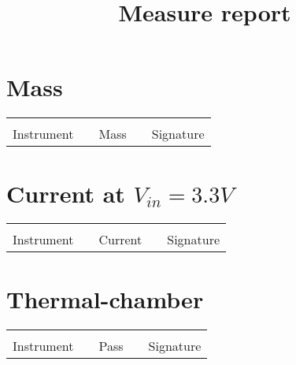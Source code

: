 \documentclass[12pt]{article}
\title{Measure report}
\begin{document}
\maketitle

\section{Mass}
\vspace{25mm}
\begin{tabular}{@{}C{1.5in}p{1in}C{1.5in}p{1in}C{1.5in}@{}}
	\hrulefill & \hfill & \hrulefill & \hfill & \hrulefill\\
	Instrument & \hfill & Mass & \hfill & Signature \\
\end{tabular}

\section{Current at $V_{in}=3.3V$}
\vspace{25mm}
\begin{tabular}{@{}C{1.5in}p{1in}C{1.5in}p{1in}C{1.5in}@{}}
	\hrulefill & \hfill & \hrulefill & \hfill & \hrulefill\\
	Instrument & \hfill & Current & \hfill & Signature \\
\end{tabular}

\section{Thermal-chamber}
\vspace{25mm}
\begin{tabular}{@{}C{1.5in}p{1in}C{1.5in}p{1in}C{1.5in}@{}}
	\hrulefill & \hfill & \hrulefill & \hfill & \hrulefill\\
	Instrument & \hfill & Pass & \hfill & Signature \\
\end{tabular}
\end{document}

